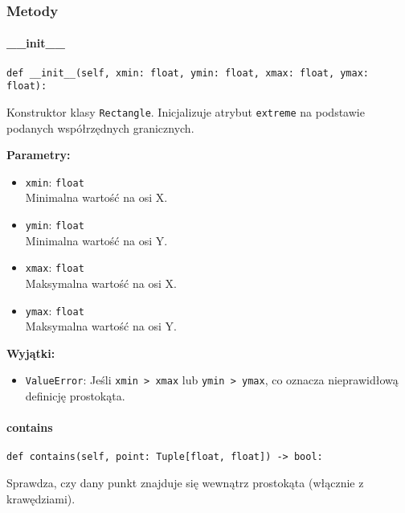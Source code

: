 \documentclass[12pt]{article}
\begin{document}
\subsubsection{Metody}

\paragraph{\_\_init\_\_}

\begin{verbatim}
def __init__(self, xmin: float, ymin: float, xmax: float, ymax: float):
\end{verbatim}

\noindent Konstruktor klasy \texttt{Rectangle}. Inicjalizuje atrybut \texttt{extreme} na podstawie podanych współrzędnych granicznych.


\noindent\textbf{Parametry:}
\begin{itemize}
    \item \texttt{xmin}: \texttt{float} \\
    Minimalna wartość na osi X.
    
    \item \texttt{ymin}: \texttt{float} \\
    Minimalna wartość na osi Y.
    
    \item \texttt{xmax}: \texttt{float} \\
    Maksymalna wartość na osi X.
    
    \item \texttt{ymax}: \texttt{float} \\
    Maksymalna wartość na osi Y.
\end{itemize}

\noindent\textbf{Wyjątki:}
\begin{itemize}
    \item \texttt{ValueError}: Jeśli \texttt{xmin > xmax} lub \texttt{ymin > ymax}, co oznacza nieprawidłową definicję prostokąta.
\end{itemize}

\paragraph{contains}

\begin{verbatim}
def contains(self, point: Tuple[float, float]) -> bool:
\end{verbatim}

\noindent Sprawdza, czy dany punkt znajduje się wewnątrz prostokąta (włącznie z krawędziami).
\end{document}
